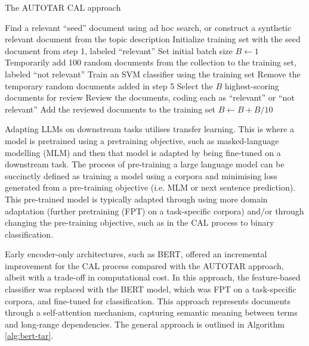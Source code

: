 \documentclass{article}
\begin{document}
\begin{algorithm}
    \caption{The AUTOTAR CAL approach}
    \label{alg:autotar}
    \begin{algorithmic}[1]
    \State Find a relevant ``seed'' document using ad hoc search, or construct a synthetic relevant document from the topic description
    \State Initialize training set with the seed document from step 1, labeled ``relevant''
    \State Set initial batch size $B \gets 1$
    \Repeat
        \State Temporarily add 100 random documents from the collection to the training set, labeled ``not relevant''
        \State Train an SVM classifier using the training set
        \State Remove the temporary random documents added in step 5
        \State Select the $B$ highest-scoring documents for review
        \State Review the documents, coding each as ``relevant'' or ``not relevant''
        \State Add the reviewed documents to the training set
        \State $B \gets B + B/10$
    \end{algorithmic}
    \end{algorithm}

Adapting LLMs on downstream tasks utilises transfer learning. This is where a model is pretrained using a pretraining objective, such as masked-language modelling (MLM) and then that model is adapted by being fine-tuned on a downstream task. The process of pre-training a large language model can be succinctly defined as training a model using a corpora and minimising loss generated from a pre-training objective (i.e. MLM or next sentence prediction). This pre-trained model is typically adapted through using more domain adaptation (further pretraining (FPT) on a task-specific corpora) and/or through changing the pre-training objective, such as in the CAL process to binary classification.

Early encoder-only architectures, such as BERT, offered an incremental improvement for the CAL process compared with the AUTOTAR approach, albeit with a trade-off in computational cost. In this approach, the feature-based classifier was replaced with the BERT model, which was FPT on a task-specific corpora, and fine-tuned for classification. This approach represents documents through a self-attention mechanism, capturing semantic meaning between terms and long-range dependencies. The general approach is outlined in Algorithm \ref{alg:bert-tar}.
\end{document}
